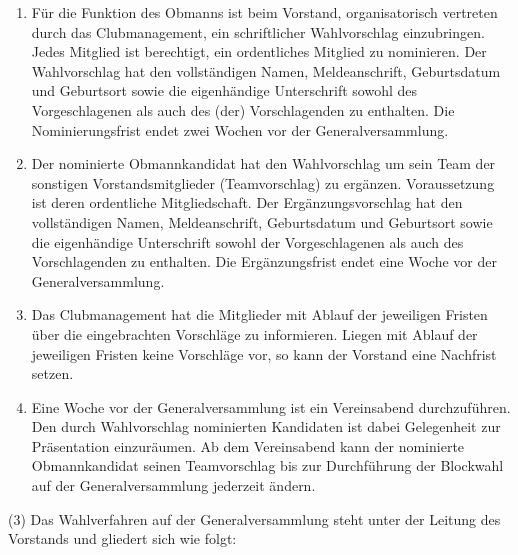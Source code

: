 \documentclass[10pt,a4paper]{article}
\begin{document}
\begin{enumerate}[label=\alph*)]
\item
Für die Funktion des Obmanns ist beim Vorstand, organisatorisch vertreten durch das Clubmanagement, ein schriftlicher Wahlvorschlag einzubringen.
Jedes Mitglied ist berechtigt, ein ordentliches Mitglied zu nominieren.
Der Wahlvorschlag hat den vollständigen Namen, Meldeanschrift, Geburtsdatum und Geburtsort sowie die eigenhändige Unterschrift sowohl des Vorgeschlagenen als auch des (der) Vorschlagenden zu enthalten.
Die Nominierungsfrist endet zwei Wochen vor der Generalversammlung.
\item
Der nominierte Obmannkandidat hat den Wahlvorschlag um sein Team der sonstigen Vorstandsmitglieder (Teamvorschlag) zu ergänzen.
Voraussetzung ist deren ordentliche Mitgliedschaft.
Der Ergänzungsvorschlag hat den vollständigen Namen, Meldeanschrift, Geburtsdatum und Geburtsort sowie die eigenhändige Unterschrift sowohl der Vorgeschlagenen als auch des Vorschlagenden zu enthalten.
Die Ergänzungsfrist endet eine Woche vor der Generalversammlung.
\item
Das Clubmanagement hat die Mitglieder mit Ablauf der jeweiligen Fristen über die eingebrachten Vorschläge zu informieren.
Liegen mit Ablauf der jeweiligen Fristen keine Vorschläge vor, so kann der Vorstand eine Nachfrist setzen.
\item
Eine Woche vor der Generalversammlung ist ein Vereinsabend durchzuführen.
Den durch Wahlvorschlag nominierten Kandidaten ist dabei Gelegenheit zur Präsentation einzuräumen.
Ab dem Vereinsabend kann der nominierte Obmannkandidat seinen Teamvorschlag bis zur Durchführung der Blockwahl auf der Generalversammlung jederzeit ändern.
\end{enumerate}

(3)
Das Wahlverfahren auf der Generalversammlung steht unter der Leitung des Vorstands und gliedert sich wie folgt:
\end{document}
